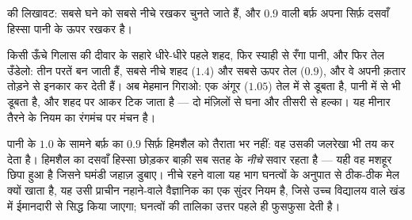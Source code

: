 \begin{omfigure}

{\small {} की लिखावट:  सबसे घने को सबसे नीचे रखकर चुनते जाते
हैं, और $0.9$ वाली बर्फ़ अपना सिर्फ़ दसवाँ हिस्सा पानी के ऊपर रखकर
 है।}
\end{omfigure}

\begin{example}[द्रवों की मीनार]\label{ex:g6:density-floating:tower}
किसी ऊँचे गिलास की दीवार के सहारे धीरे-धीरे पहले शहद, फिर स्याही से
रँगा पानी, और फिर तेल उँडेलो: तीन परतें बन जाती हैं, सबसे नीचे शहद
($1.4$) और सबसे ऊपर तेल ($0.9$), और वे अपनी क़तार तोड़ने से इनकार कर
देती हैं। अब मेहमान गिराओ: एक अंगूर ($1.05$) तेल में से डूबता है, पानी
में से भी डूबता है, और शहद पर आकर टिक जाता है --- दो मंज़िलों से घना
और तीसरी से हल्का। यह मीनार तैरने के नियम का रंगमंच पर मंचन है।
\end{example}

\begin{remark}[हिमशैल पढ़ना]\label{rem:g6:density-floating:iceberg}
पानी के $1.0$ के सामने बर्फ़ का $0.9$ सिर्फ़ हिमशैल को तैराता भर नहीं:
वह उसकी जलरेखा भी तय कर देता है। हिमशैल का दसवाँ हिस्सा छोड़कर बाक़ी
सब सतह के \emph{नीचे} सवार रहता है --- यही वह मशहूर छिपा हुआ 
है जिसने घमंडी जहाज़ डुबाए। नीचे रहने वाला यह भाग घनत्वों के अनुपात से
ठीक-ठीक मेल क्यों खाता है, यह उसी प्राचीन नहाने-वाले वैज्ञानिक का एक
सुंदर नियम है, जिसे उच्च विद्यालय वाले खंड में ईमानदारी से सिद्ध किया
जाएगा; घनत्वों की तालिका उत्तर पहले ही फुसफुसा देती है।
\end{remark}

